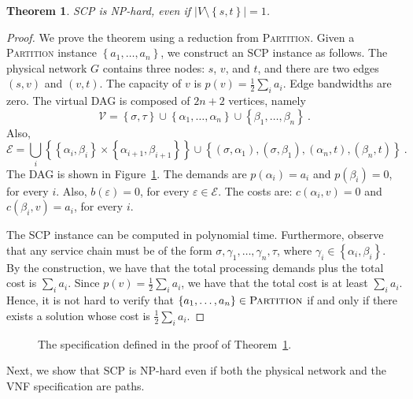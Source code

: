 \documentclass[11pt]{article}
\newtheorem{theorem}{Theorem}
\newcommand{\set}[1]{\left\{ #1 \right\}}
\newcommand{\abs}[1]{\left| #1 \right|}
\newcommand{\half}{\frac{1}{2}}
\newcommand{\eps}{\varepsilon}
\newcommand{\scp}{\textsc{SCP}\xspace}
\newcommand{\calE}{\mathcal{E}}
\newcommand{\calV}{\mathcal{V}}
\begin{document}
\begin{theorem}
\label{thm:simple}
\scp is NP-hard, even if $\abs{V \setminus \set{s,t}} = 1$.
\end{theorem}
\begin{proof}
We prove the theorem using a reduction from \textsc{Partition}.
Given a \textsc{Partition} instance $\set{a_1, \ldots, a_n}$, we
construct an \scp instance as follows.
%
The physical network $G$ contains three nodes: $s$, $v$, and $t$, and
there are two edges $(s,v)$ and $(v,t)$.  The capacity of $v$ is $p(v)
= \half \sum_i a_i$.  Edge bandwidths are zero.
%
The virtual DAG is composed of $2n+2$ vertices, namely
\[
\calV
= \set{\sigma,\tau}
  \cup \set{\alpha_1, \ldots, \alpha_n}
  \cup \set{\beta_1, \ldots, \beta_n}
~.
\]
Also,
\[
\calE
= \bigcup_i \set{ \set{\alpha_i,\beta_i} \times \set{\alpha_{i+1},\beta_{i+1}} } 
  \cup
  \set{ (\sigma,\alpha_1), (\sigma,\beta_1), (\alpha_n,t), (\beta_n,t) }
~.
\]
The DAG is shown in Figure~\ref{fig:simple}.
%
The demands are $p(\alpha_i) = a_i$ and $p(\beta_i) = 0$, for every
$i$.  Also, $b(\eps) = 0$, for every $\eps \in \calE$.  The costs are:
$c(\alpha_i,v) = 0$ and $c(\beta_i,v) = a_i$, for every $i$.

The \scp instance can be computed in polynomial time.
%
Furthermore, observe that any service chain must be of the form
$\sigma, \gamma_1, \ldots, \gamma_n, \tau$, where $\gamma_i \in
\set{\alpha_i,\beta_i}$.  By the construction, we have that the total
processing demands plus the total cost is $\sum_i a_i$.  Since $p(v) =
\half \sum_i a_i$, we have that the total cost is at least $\sum_i
a_i$.  Hence, it is not hard to verify that $\set{a_1, \ldots, a_n}
\in \textsc{Partition}$ if and only if there exists a solution whose
cost is $\half \sum_i a_i$.
\end{proof}

\begin{figure}[t]
  \centering
\scalebox{1}{
  
}
\caption{The specification defined in the proof of Theorem~\ref{thm:simple}.}
\label{fig:simple}
\end{figure}

Next, we show that \scp is NP-hard even if both the physical network
and the VNF specification are paths.
\end{document}
